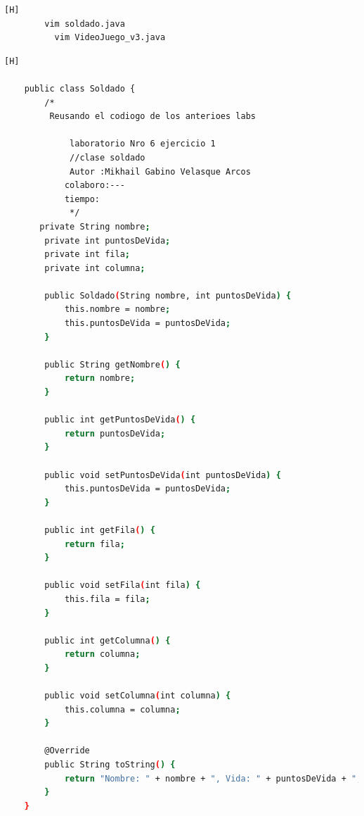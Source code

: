 \documentclass{article}
\begin{document}
	\begin{lstlisting}[language=bash,caption={Creando la clase soldado y la clase VideoJuego_v3}][H]
		vim soldado.java
		  vim VideoJuego_v3.java
	\end{lstlisting}
	
	\begin{lstlisting}[language=bash,caption={Creando la clase Soldado}][H]
			
	public class Soldado {
		/*
		 Reusando el codiogo de los anterioes labs
		
			 laboratorio Nro 6 ejercicio 1
			 //clase soldado
			 Autor :Mikhail Gabino Velasque Arcos
			colaboro:---
			tiempo:
			 */
	   private String nombre;
	    private int puntosDeVida;
	    private int fila;
	    private int columna;

	    public Soldado(String nombre, int puntosDeVida) {
	        this.nombre = nombre;
	        this.puntosDeVida = puntosDeVida;
	    }

	    public String getNombre() {
	        return nombre;
	    }

	    public int getPuntosDeVida() {
	        return puntosDeVida;
	    }

	    public void setPuntosDeVida(int puntosDeVida) {
	        this.puntosDeVida = puntosDeVida;
	    }

	    public int getFila() {
	        return fila;
	    }

	    public void setFila(int fila) {
	        this.fila = fila;
	    }

	    public int getColumna() {
	        return columna;
	    }

	    public void setColumna(int columna) {
	        this.columna = columna;
	    }

	    @Override
	    public String toString() {
	        return "Nombre: " + nombre + ", Vida: " + puntosDeVida + ", Fila: " + fila + ", Columna: " + columna;
	    }
	}

			
			
			
			
			
	\end{lstlisting}	
\end{document}

